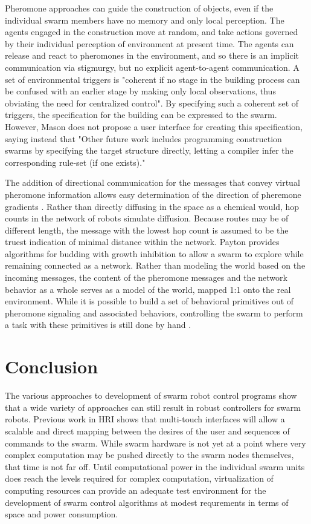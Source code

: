 \documentclass[]{article}
\begin{document}
Pheromone approaches can guide the construction of objects, even if the individual swarm members have no memory and only local perception\cite{mason2003programming}. 
The agents engaged in the construction move at random, and take actions governed by their individual perception of environment at present time. 
The agents can release and react to pheromones in the environment, and so there is an implicit communication via stigmurgy, but no explicit agent-to-agent communication. 
A set of environmental triggers is "coherent if no stage in the building process can be confused with an earlier stage by making only local observations, thus obviating the need for centralized control".   
By specifying such a coherent set of triggers, the specification for the building can be expressed to the swarm. 
However, Mason does not propose a user interface for creating this specification, saying instead that "Other future work includes programming construction swarms by specifying the target structure directly, letting a compiler infer the corresponding rule-set (if one exists)."

The addition of directional communication for the messages that convey virtual pheromone information allows easy determination of the direction of pheremone gradients \cite{payton2001pheromone}.
Rather than directly diffusing in the space as a chemical would, hop counts in the network of robots simulate diffusion. 
Because routes may be of different length, the message with the lowest hop count is assumed to be the truest indication of minimal distance within the network. 
Payton provides algorithms for budding with growth inhibition to allow a swarm to explore while remaining connected as a network. 
Rather than modeling the world based on the incoming messages, the content of the pheromone messages and the network behavior as a whole serves as a model of the world, mapped 1:1 onto the real environment. 
While it is possible to build a set of behavioral primitives out of pheromone signaling and associated behaviors, controlling the swarm to perform a task with these primitives is still done by hand \cite{payton2003compound}.

\section{Conclusion}

The various approaches to development of swarm robot control programs show that a wide variety of approaches can still result in robust controllers for swarm robots. 
Previous work in HRI shows that multi-touch interfaces will allow a scalable and direct mapping between the desires of the user and sequences of commands to the swarm. 
While swarm hardware is not yet at a point where very complex computation may be pushed directly to the swarm nodes themselves, that time is not far off. 
Until computational power in the individual swarm units does reach the levels required for complex computation, virtualization of computing resources can provide an adequate test environment for the development of swarm control algorithms at modest requrements in terms of space and power consumption. 



\end{document}
